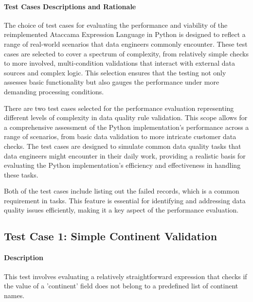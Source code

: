 
\paragraph{Test Cases Descriptions and Rationale}

The choice of test cases for evaluating the performance and viability of the reimplemented Ataccama Expression Language in Python is designed to reflect a range of real-world scenarios that data engineers commonly encounter. These test cases are selected to cover a spectrum of complexity, from relatively simple checks to more involved, multi-condition validations that interact with external data sources and complex logic. This selection ensures that the testing not only assesses basic functionality but also gauges the performance under more demanding processing conditions. 

There are two test cases selected for the performance evaluation representing different levels of complexity in data quality rule validation. This scope allows for a comprehensive assessment of the Python implementation's performance across a range of scenarios, from basic data validation to more intricate customer data checks. The test cases are designed to simulate common data quality tasks that data engineers might encounter in their daily work, providing a realistic basis for evaluating the Python implementation's efficiency and effectiveness in handling these tasks.

Both of the test cases include listing out the failed records, which is a common requirement in  tasks. This feature is essential for identifying and addressing data quality issues efficiently, making it a key aspect of the performance evaluation.

\subsection{Test Case 1: Simple Continent Validation}

\paragraph{Description} This test involves evaluating a relatively straightforward expression that checks if the value of a 'continent' field does not belong to a predefined list of continent names. 

